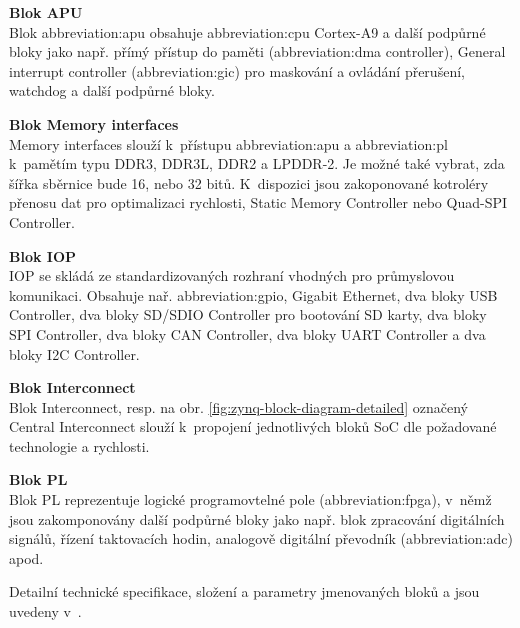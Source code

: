 \documentclass[a4paper, twoside, 11pt]{article}
\begin{document}
			\noindent\textbf{Blok APU}\\
			Blok \gls{abbreviation:apu} obsahuje \gls{abbreviation:cpu} Cortex-A9 a další podpůrné bloky jako např. přímý přístup do paměti (\gls{abbreviation:dma} controller), General interrupt controller (\gls{abbreviation:gic}) pro maskování a ovládání přerušení, watchdog a další podpůrné bloky.\par\vspace*{0.25cm}
			\noindent\textbf{Blok Memory interfaces}\\
			Memory interfaces slouží k~přístupu \gls{abbreviation:apu} a \gls{abbreviation:pl} k~pamětím typu DDR3, DDR3L, DDR2 a LPDDR-2. Je možné také vybrat, zda šířka sběrnice bude 16, nebo 32 bitů. K~dispozici jsou zakoponované kotroléry přenosu dat pro optimalizaci rychlosti, Static Memory Controller nebo Quad-SPI Controller.\par\vspace*{0.25cm}
			\noindent\textbf{Blok IOP}\\
			IOP se skládá ze standardizovaných rozhraní vhodných pro průmyslovou komunikaci. Obsahuje nař. \gls{abbreviation:gpio}, Gigabit Ethernet, dva bloky USB Controller, dva bloky SD/SDIO Controller pro bootování SD karty, dva bloky SPI Controller, dva bloky CAN Controller, dva bloky UART Controller a dva bloky I2C Controller.\par\vspace*{0.25cm}
			\noindent\textbf{Blok Interconnect}\\
			Blok Interconnect, resp. na obr. \ref{fig:zynq-block-diagram-detailed} označený Central Interconnect slouží k~propojení jednotlivých bloků SoC dle požadované technologie a rychlosti.\par\vspace*{0.25cm}
			\noindent\textbf{Blok PL}\\
			Blok PL reprezentuje logické programovtelné pole (\gls{abbreviation:fpga}), v~němž jsou zakomponovány další podpůrné bloky jako např. blok zpracování digitálních signálů, řízení taktovacích hodin, analogově digitální převodník (\gls{abbreviation:adc}) apod.\par\vspace*{0.35cm}
			\noindent Detailní technické specifikace, složení a parametry jmenovaných bloků a jsou uvedeny v~\cite{xilinx-zynq-7000-technical-reference-manual}.
\end{document}

